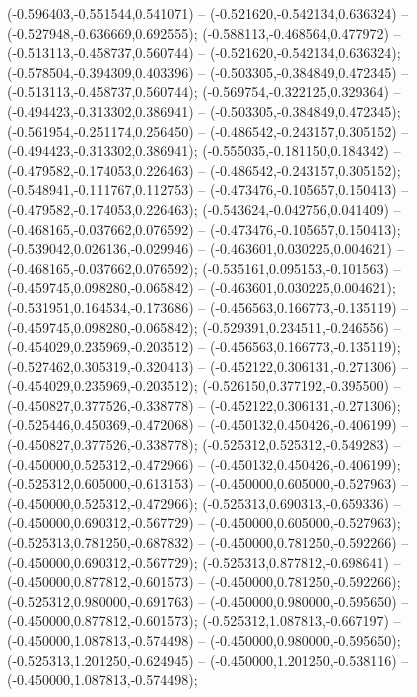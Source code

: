  (-0.596403,-0.551544,0.541071) -- (-0.521620,-0.542134,0.636324) -- (-0.527948,-0.636669,0.692555);
 (-0.588113,-0.468564,0.477972) -- (-0.513113,-0.458737,0.560744) -- (-0.521620,-0.542134,0.636324);
 (-0.578504,-0.394309,0.403396) -- (-0.503305,-0.384849,0.472345) -- (-0.513113,-0.458737,0.560744);
 (-0.569754,-0.322125,0.329364) -- (-0.494423,-0.313302,0.386941) -- (-0.503305,-0.384849,0.472345);
 (-0.561954,-0.251174,0.256450) -- (-0.486542,-0.243157,0.305152) -- (-0.494423,-0.313302,0.386941);
 (-0.555035,-0.181150,0.184342) -- (-0.479582,-0.174053,0.226463) -- (-0.486542,-0.243157,0.305152);
 (-0.548941,-0.111767,0.112753) -- (-0.473476,-0.105657,0.150413) -- (-0.479582,-0.174053,0.226463);
 (-0.543624,-0.042756,0.041409) -- (-0.468165,-0.037662,0.076592) -- (-0.473476,-0.105657,0.150413);
 (-0.539042,0.026136,-0.029946) -- (-0.463601,0.030225,0.004621) -- (-0.468165,-0.037662,0.076592);
 (-0.535161,0.095153,-0.101563) -- (-0.459745,0.098280,-0.065842) -- (-0.463601,0.030225,0.004621);
 (-0.531951,0.164534,-0.173686) -- (-0.456563,0.166773,-0.135119) -- (-0.459745,0.098280,-0.065842);
 (-0.529391,0.234511,-0.246556) -- (-0.454029,0.235969,-0.203512) -- (-0.456563,0.166773,-0.135119);
 (-0.527462,0.305319,-0.320413) -- (-0.452122,0.306131,-0.271306) -- (-0.454029,0.235969,-0.203512);
 (-0.526150,0.377192,-0.395500) -- (-0.450827,0.377526,-0.338778) -- (-0.452122,0.306131,-0.271306);
 (-0.525446,0.450369,-0.472068) -- (-0.450132,0.450426,-0.406199) -- (-0.450827,0.377526,-0.338778);
 (-0.525312,0.525312,-0.549283) -- (-0.450000,0.525312,-0.472966) -- (-0.450132,0.450426,-0.406199);
 (-0.525312,0.605000,-0.613153) -- (-0.450000,0.605000,-0.527963) -- (-0.450000,0.525312,-0.472966);
 (-0.525313,0.690313,-0.659336) -- (-0.450000,0.690312,-0.567729) -- (-0.450000,0.605000,-0.527963);
 (-0.525313,0.781250,-0.687832) -- (-0.450000,0.781250,-0.592266) -- (-0.450000,0.690312,-0.567729);
 (-0.525313,0.877812,-0.698641) -- (-0.450000,0.877812,-0.601573) -- (-0.450000,0.781250,-0.592266);
 (-0.525312,0.980000,-0.691763) -- (-0.450000,0.980000,-0.595650) -- (-0.450000,0.877812,-0.601573);
 (-0.525312,1.087813,-0.667197) -- (-0.450000,1.087813,-0.574498) -- (-0.450000,0.980000,-0.595650);
 (-0.525313,1.201250,-0.624945) -- (-0.450000,1.201250,-0.538116) -- (-0.450000,1.087813,-0.574498);
